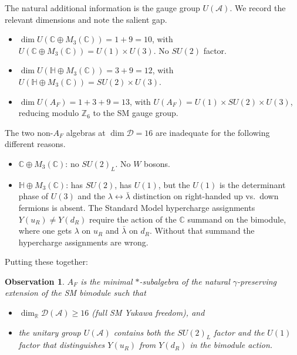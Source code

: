 \documentclass[11pt,a4paper]{article}
\newtheorem{observation}[theorem]{Observation}
\begin{document}
The natural additional information is the gauge group $U(\mathcal{A})$. We
record the relevant dimensions and note the salient gap.
\begin{itemize}[leftmargin=2em]
  \item $\dim U(\mathbb{C} \oplus M_3(\mathbb{C})) = 1 + 9 = 10$, with
        $U(\mathbb{C} \oplus M_3(\mathbb{C})) = U(1) \times U(3)$. No
        $SU(2)$ factor.
  \item $\dim U(\mathbb{H} \oplus M_3(\mathbb{C})) = 3 + 9 = 12$, with
        $U(\mathbb{H} \oplus M_3(\mathbb{C})) = SU(2) \times U(3)$.
  \item $\dim U(A_F) = 1 + 3 + 9 = 13$, with
        $U(A_F) = U(1) \times SU(2) \times U(3)$, reducing modulo
        $\mathbb{Z}_6$ to the SM gauge group.
\end{itemize}
The two non-$A_F$ algebras at $\dim \mathcal{D} = 16$ are inadequate for the
following different reasons.
\begin{itemize}[leftmargin=2em]
  \item $\mathbb{C} \oplus M_3(\mathbb{C})$: no $SU(2)_L$. No $W$ bosons.
  \item $\mathbb{H} \oplus M_3(\mathbb{C})$: has $SU(2)$, has $U(1)$, but the
        $U(1)$ is the determinant phase of $U(3)$ and the $\lambda \leftrightarrow
        \bar\lambda$ distinction on right-handed up vs.\ down fermions is
        absent. The Standard Model hypercharge assignments
        $Y(u_R) \neq Y(d_R)$ require the action of the $\mathbb{C}$ summand on
        the bimodule, where one gets $\lambda$ on $u_R$ and $\bar\lambda$ on
        $d_R$. Without that summand the hypercharge assignments are wrong.
\end{itemize}

Putting these together:

\begin{observation}\label{obs:two-conditions}
$A_F$ is the minimal $*$-subalgebra of the natural $\gamma$-preserving extension
of the SM bimodule such that
\begin{itemize}[leftmargin=2em,nosep]
  \item $\dim_{\mathbb{R}} \mathcal{D}(\mathcal{A}) \ge 16$ (full SM Yukawa
        freedom), \emph{and}
  \item the unitary group $U(\mathcal{A})$ contains both the $SU(2)_L$ factor
        and the $U(1)$ factor that distinguishes $Y(u_R)$ from $Y(d_R)$ in the
        bimodule action.
\end{itemize}
\end{observation}
\end{document}
